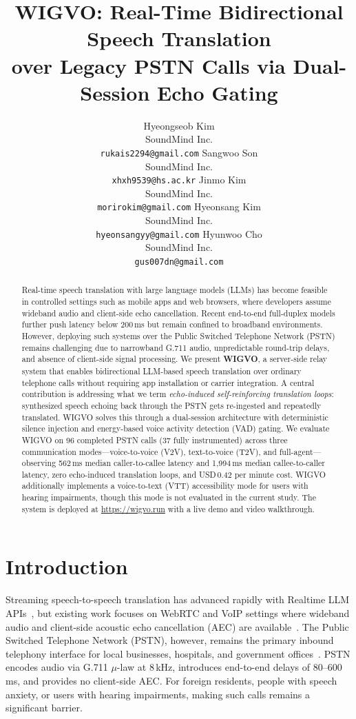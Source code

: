 \documentclass[11pt]{article}
\title{WIGVO: Real-Time Bidirectional Speech Translation\\over Legacy PSTN Calls via Dual-Session Echo Gating}
\author{
  Hyeongseob Kim \\
  SoundMind Inc. \\
  \texttt{rukais2294@gmail.com}
  \AND
  Sangwoo Son \\
  SoundMind Inc. \\
  \texttt{xhxh9539@hs.ac.kr}
  \AND
  Jinmo Kim \\
  SoundMind Inc. \\
  \texttt{morirokim@gmail.com}
  \AND
  Hyeonsang Kim \\
  SoundMind Inc. \\
  \texttt{hyeonsangyy@gmail.com}
  \AND
  Hyunwoo Cho \\
  SoundMind Inc. \\
  \texttt{gus007dn@gmail.com}
}
\begin{document}
\maketitle

\begin{abstract}
Real-time speech translation with large language models (LLMs) has become feasible in controlled settings such as mobile apps and web browsers, where developers assume wideband audio and client-side echo cancellation. Recent end-to-end full-duplex models further push latency below 200\,ms but remain confined to broadband environments. However, deploying such systems over the Public Switched Telephone Network (PSTN) remains challenging due to narrowband G.711 audio, unpredictable round-trip delays, and absence of client-side signal processing. We present \textbf{WIGVO}, a server-side relay system that enables bidirectional LLM-based speech translation over ordinary telephone calls without requiring app installation or carrier integration. A central contribution is addressing what we term \emph{echo-induced self-reinforcing translation loops}: synthesized speech echoing back through the PSTN gets re-ingested and repeatedly translated. WIGVO solves this through a dual-session architecture with deterministic silence injection and energy-based voice activity detection (VAD) gating. We evaluate WIGVO on 96 completed PSTN calls (37 fully instrumented) across three communication modes---voice-to-voice (V2V), text-to-voice (T2V), and full-agent---observing 562\,ms median caller-to-callee latency and 1{,}994\,ms median callee-to-caller latency, zero echo-induced translation loops, and USD\,0.42 per minute cost. WIGVO additionally implements a voice-to-text (VTT) accessibility mode for users with hearing impairments, though this mode is not evaluated in the current study. The system is deployed at \url{https://wigvo.run} with a live demo and video walkthrough.
\end{abstract}

\section{Introduction}

Streaming speech-to-speech translation has advanced rapidly with Realtime LLM APIs~\citep{openai_realtime_api_2024}, but existing work focuses on WebRTC and VoIP settings where wideband audio and client-side acoustic echo cancellation (AEC) are available~\citep{seamless_streaming_2023,whisper_radford_2023}. The Public Switched Telephone Network (PSTN), however, remains the primary inbound telephony interface for local businesses, hospitals, and government offices~\citep{itu_pstn_overview_2020}. PSTN encodes audio via G.711 $\mu$-law at 8\,kHz, introduces end-to-end delays of 80--600\,ms, and provides no client-side AEC. For foreign residents, people with speech anxiety, or users with hearing impairments, making such calls remains a significant barrier.
\end{document}
